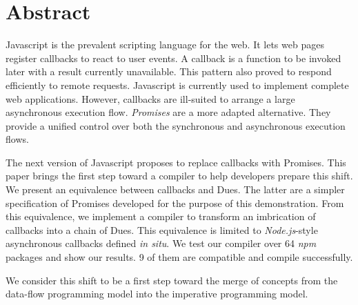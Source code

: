 \section*{Abstract}

Javascript is the prevalent scripting language for the web.
It lets web pages register callbacks to react to user events.
A callback is a function to be invoked later with a result currently unavailable.
This pattern also proved to respond efficiently to remote requests.
Javascript is currently used to implement complete web applications.
However, callbacks are ill-suited to arrange a large asynchronous execution flow.
\textit{Promises} are a more adapted alternative.
They provide a unified control over both the synchronous and asynchronous execution flows.

The next version of Javascript proposes to replace callbacks with Promises.
This paper brings the first step toward a compiler to help developers prepare this shift.
We present an equivalence between callbacks and Dues.
The latter are a simpler specification of Promises developed for the purpose of this demonstration.
From this equivalence, we implement a compiler to transform an imbrication of callbacks into a chain of Dues.
This equivalence is limited to \textit{Node.js}-style asynchronous callbacks defined \textit{in situ}.
We test our compiler over 64 \textit{npm} packages and show our results.
9 of them are compatible and compile successfully.

We consider this shift to be a first step toward the merge of concepts from the data-flow programming model into the imperative programming model.

